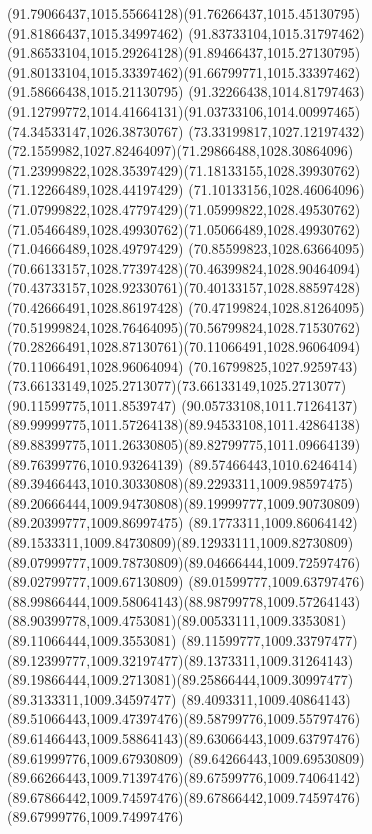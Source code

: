 {    \curveto(91.79066437,1015.55664128)(91.76266437,1015.45130795)(91.81866437,1015.34997462)
    \curveto(91.83733104,1015.31797462)(91.86533104,1015.29264128)(91.89466437,1015.27130795)
    \curveto(91.80133104,1015.33397462)(91.66799771,1015.33397462)(91.58666438,1015.21130795)
    \curveto(91.32266438,1014.81797463)(91.12799772,1014.41664131)(91.03733106,1014.00997465)
    \lineto(74.34533147,1026.38730767)
    \curveto(73.33199817,1027.12197432)(72.1559982,1027.82464097)(71.29866488,1028.30864096)
    \curveto(71.23999822,1028.35397429)(71.18133155,1028.39930762)(71.12266489,1028.44197429)
    \curveto(71.10133156,1028.46064096)(71.07999822,1028.47797429)(71.05999822,1028.49530762)
    \curveto(71.05466489,1028.49930762)(71.05066489,1028.49930762)(71.04666489,1028.49797429)
    \curveto(70.85599823,1028.63664095)(70.66133157,1028.77397428)(70.46399824,1028.90464094)
    \curveto(70.43733157,1028.92330761)(70.40133157,1028.88597428)(70.42666491,1028.86197428)
    \curveto(70.47199824,1028.81264095)(70.51999824,1028.76464095)(70.56799824,1028.71530762)
    \curveto(70.28266491,1028.87130761)(70.11066491,1028.96064094)(70.11066491,1028.96064094)
    \curveto(70.16799825,1027.9259743)(73.66133149,1025.2713077)(73.66133149,1025.2713077)
    \lineto(90.11599775,1011.8539747)
    \curveto(90.05733108,1011.71264137)(89.99999775,1011.57264138)(89.94533108,1011.42864138)
    \curveto(89.88399775,1011.26330805)(89.82799775,1011.09664139)(89.76399776,1010.93264139)
    \curveto(89.57466443,1010.6246414)(89.39466443,1010.30330808)(89.2293311,1009.98597475)
    \curveto(89.20666444,1009.94730808)(89.19999777,1009.90730809)(89.20399777,1009.86997475)
    \curveto(89.1773311,1009.86064142)(89.1533311,1009.84730809)(89.12933111,1009.82730809)
    \curveto(89.07999777,1009.78730809)(89.04666444,1009.72597476)(89.02799777,1009.67130809)
    \curveto(89.01599777,1009.63797476)(88.99866444,1009.58064143)(88.98799778,1009.57264143)
    \curveto(88.90399778,1009.4753081)(89.00533111,1009.3353081)(89.11066444,1009.3553081)
    \curveto(89.11599777,1009.33797477)(89.12399777,1009.32197477)(89.1373311,1009.31264143)
    \curveto(89.19866444,1009.2713081)(89.25866444,1009.30997477)(89.3133311,1009.34597477)
    \curveto(89.4093311,1009.40864143)(89.51066443,1009.47397476)(89.58799776,1009.55797476)
    \curveto(89.61466443,1009.58864143)(89.63066443,1009.63797476)(89.61999776,1009.67930809)
    \curveto(89.64266443,1009.69530809)(89.66266443,1009.71397476)(89.67599776,1009.74064142)
    \curveto(89.67866442,1009.74597476)(89.67866442,1009.74597476)(89.67999776,1009.74997476)
}
